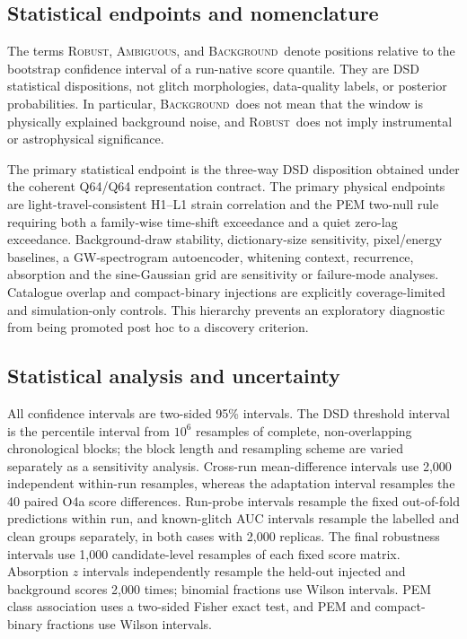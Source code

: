 \documentclass[12pt]{article}
\newcommand{\robust}{\textsc{Robust}}
\newcommand{\ambiguous}{\textsc{Ambiguous}}
\newcommand{\background}{\textsc{Background}}
\begin{document}
\subsection{Statistical endpoints and nomenclature}

The terms \robust, \ambiguous, and \background\ denote positions relative to
the bootstrap confidence interval of a run-native score quantile.  They are
DSD statistical dispositions, not glitch morphologies, data-quality labels, or
posterior probabilities.  In particular, \background\ does not mean that the
window is physically explained background noise, and \robust\ does not imply
instrumental or astrophysical significance.

The primary statistical endpoint is the three-way DSD disposition obtained
under the coherent Q64/Q64 representation contract.  The primary physical
endpoints are light-travel-consistent H1--L1 strain correlation and the PEM
two-null rule requiring both a family-wise time-shift exceedance and a quiet
zero-lag exceedance.  Background-draw stability, dictionary-size sensitivity,
pixel/energy baselines, a GW-spectrogram autoencoder, whitening context,
recurrence, absorption and the
sine-Gaussian grid are sensitivity or failure-mode analyses.  Catalogue
overlap and compact-binary injections are explicitly coverage-limited and
simulation-only controls.  This hierarchy prevents an exploratory diagnostic
from being promoted post hoc to a discovery criterion.

\subsection{Statistical analysis and uncertainty}

All confidence intervals are two-sided 95\% intervals.  The DSD threshold
interval is the percentile interval from $10^6$ resamples of complete,
non-overlapping chronological blocks; the block length and resampling scheme
are varied separately as a sensitivity analysis.  Cross-run mean-difference
intervals use 2,000 independent within-run resamples, whereas the adaptation
interval resamples the 40 paired O4a score differences.  Run-probe intervals
resample the fixed out-of-fold predictions within run, and known-glitch AUC
intervals resample the labelled and clean groups separately, in both cases
with 2,000 replicas.  The final robustness intervals use 1,000 candidate-level
resamples of each fixed score matrix.  Absorption $z$ intervals independently
resample the held-out injected and background scores 2,000 times; binomial
fractions use Wilson intervals.  PEM class association uses a two-sided Fisher
exact test, and PEM and compact-binary fractions use Wilson intervals.
\end{document}
